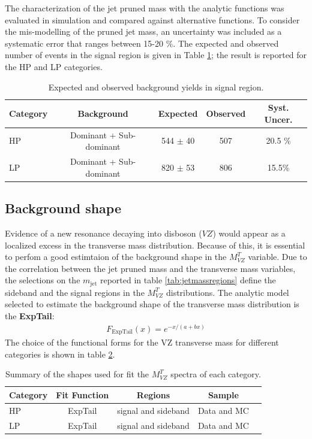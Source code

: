The characterization of the jet pruned mass with the analytic functions was evaluated in simulation and compared against alternative functions. To consider the mis-modelling of the pruned jet mass, an uncertainty was included as a systematic error that ranges between 15-20 $\%$. The expected and observed number of events in the signal region is given in Table \ref{tab:backyields4}; the result is reported for the HP and LP categories.

\begin{table}[!ht]
\begin{center}
\caption{Expected and observed background yields in signal region.}
\label{tab:backyields4}
\begin{tabular}{lcccc} \hline
Category & Background &  Expected & Observed & Syst. Uncer.\\ \hline
HP & Dominant + Sub-dominant  &  544 $\pm$ 40  & 507 & 20.5 $\%$  \\
LP & Dominant + Sub-dominant  &  820 $\pm$ 53 & 806  &  15.5$\%$  \\ \hline
\end{tabular}
\end{center}
\end{table}

\subsection{Background shape}

Evidence of a new resonance decaying into disboson ($VZ$) would appear as a localized excess in the transverse mass distribution. Because of this, it is essential to perfom a good estimtaion of the background shape in the $M_{VZ}^{T}$ variable. Due to the correlation between the jet pruned mass and the transverse mass variables, the selections on the $m_{\text{jet}}$ reported in table \ref{tab:jetmassregions} define the sideband and the signal regions in the $M_{VZ}^{T}$ distributions. The analytic model selected to estimate the background shape of the transverse mass distribution is the \textbf{ExpTail}:
\begin{eqnarray}
F_{\text{ExpTail}}(x) = e^{-x/(a+bx)}
\end{eqnarray}
The choice of the functional forms for the VZ transverse mass for different categories is shown in table \ref{tab:trasnversefunctions}.
\begin{table}[h]
\begin{center}
\caption{Summary of the shapes used for fit the $M_{VZ}^{T}$ spectra of each category.}
\label{tab:trasnversefunctions}
\begin{tabular}{lcccc} \hline
Category & Fit Function & Regions & Sample \\ \hline
HP  &  ExpTail  &  signal and sideband  & Data and MC \\
LP  &  ExpTail  &  signal and sideband  & Data and MC \\ \hline
\end{tabular}
\end{center}
\end{table}

